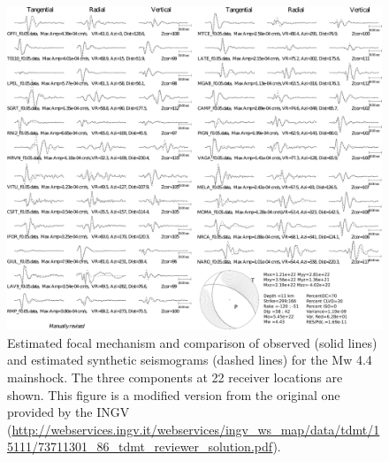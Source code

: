 \documentclass[a4paper,12pt]{article}
\begin{document}
\begin{figure}
\renewcommand{\thefigure}{S\arabic{figure}}
\begin{center}
 \noindent \includegraphics[width=1\linewidth]{S2_Focal_synthetics} 
\end{center}
\caption{Estimated focal mechanism and comparison of observed (solid lines) and estimated synthetic seismograms (dashed lines) for the Mw 4.4 mainshock. The three components at 22 receiver locations are shown. This figure is a modified version from the original one provided by the INGV (\url{http://webservices.ingv.it/webservices/ingv_ws_map/data/tdmt/15111/73711301_86_tdmt_reviewer_solution.pdf}).}\label{fig:S2_focal_mechanism}
\end{figure}
\end{document}

